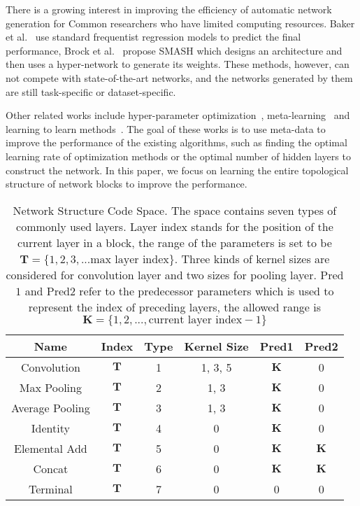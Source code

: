 \documentclass[10pt,journal,compsoc]{IEEEtran}
\begin{document}
There is a growing interest in improving the efficiency of automatic network generation for Common researchers who have limited computing resources. Baker et al.~\cite{baker2017practical} use standard frequentist regression models to predict the final performance,  Brock et al.~\cite{brock2017smash} propose SMASH which designs an architecture and then uses a hyper-network to generate its weights. These methods, however, can not compete with state-of-the-art networks, and the networks generated by them are still task-specific or dataset-specific.

Other related works include hyper-parameter optimization~\cite{bergstra2011algorithms}, meta-learning~\cite{vilalta2002perspective} and learning to learn methods~\cite{hochreiter2001learning,andrychowicz2016learning}. The goal of these works is to use meta-data to improve the performance of the existing algorithms, such as finding the optimal learning rate of optimization methods or the optimal number of hidden layers to construct the network. In this paper, we focus on learning the entire topological structure of network blocks to improve the performance.

\begin{table}[t!]
	\renewcommand{\arraystretch}{1.3}
	\begin{center}
		\caption{Network Structure Code Space. The space contains seven types of commonly used layers. Layer index stands for the position of the current layer in a block, the range of the parameters is set to be $\mathbf{T}=\{1,2,3,...\mbox{max layer index}\}$. Three kinds of kernel sizes are considered for convolution layer and two sizes for pooling layer. Pred$1$ and Pred$2$ refer to the predecessor parameters which is used to represent the index of preceding layers, the allowed range is $\mathbf{K}=\{1,2,...,\mbox{current layer index}-1\}$} \label{table:1}
		\footnotesize
		\begin{tabular}{c|c|c|c|c|c}
			\hline
			Name&Index&Type&Kernel Size&Pred1&Pred2 \\
			\hline
			Convolution&\(\mathbf{T}\)&1& 1, 3, 5 & \(\mathbf{K}\) & 0 \\
			\hline
			Max Pooling&\(\mathbf{T}\)&2&1, 3 & \(\mathbf{K}\) & 0 \\
			\hline
			Average Pooling&\(\mathbf{T}\)&3& 1, 3 & \(\mathbf{K}\) & 0\\
			\hline
			Identity&\(\mathbf{T}\)&4& 0 & \(\mathbf{K}\) & 0\\
			\hline
			Elemental Add&\(\mathbf{T}\)&5& 0 & \(\mathbf{K}\) & \(\mathbf{K}\)\\
			\hline
			Concat&\(\mathbf{T}\)&6& 0 & \(\mathbf{K}\) & \(\mathbf{K}\)\\
			\hline
			Terminal&\(\mathbf{T}\)&7& 0 & 0 & 0\\
			\hline
		\end{tabular}
	\end{center}

\end{table}
\end{document}
